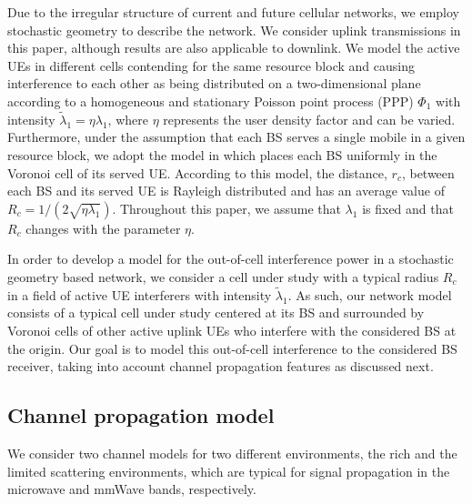 \documentclass[12pt, draftclsnofoot, onecolumn]{IEEEtran}
\theoremstyle{plain}
\begin{document}
 Due to the irregular structure of current and future cellular networks, we employ stochastic geometry to describe the network. We consider uplink transmissions in this paper, although results are also applicable to downlink. We model the active UEs in different cells contending for the same resource block and causing interference to each other as being distributed on a two-dimensional plane according to a homogeneous and stationary Poisson point process {(PPP)} $ \Phi_1 $ with intensity $ \tilde{\lambda}_1 = \eta \lambda_1 ${, where $\eta$ represents the user density factor and can be varied}. 
Furthermore, under the assumption that each BS serves a single mobile in a given resource block, we adopt the model in \cite{ref2} which places each BS uniformly in the %
Voronoi cell of its served UE. According to this model, the distance, $r_c$, between each BS and its served UE is Rayleigh distributed and has an average value of $R_c=1/({2\sqrt{\eta\lambda_1}})$. Throughout this paper, we assume that $\lambda_1$ is fixed and that $R_c$ changes with the parameter $\eta$. 
 
 
 
 In order to develop a model for the out-of-cell interference power in a stochastic geometry based network, we consider a cell under study with a typical radius $R_c$ in a field of active UE interferers with intensity $\tilde{\lambda}_1$. 
 As such, our network model consists of a typical cell under study centered at its BS and surrounded by Voronoi cells of other active uplink UEs who interfere with the considered BS at the origin. Our goal is to model this out-of-cell interference to the considered BS receiver, taking into account channel propagation {features} as discussed next.

\vspace{-.1in}
\subsection{Channel propagation model}\label{PhyCh}\vspace{-.1in}
We consider two channel models for two different environments, the rich and the limited scattering environments, which are typical for signal propagation in the microwave and mmWave bands, respectively.
%
\end{document}
